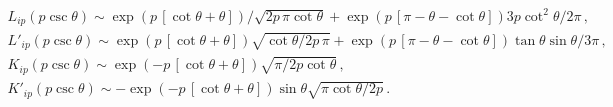 \begin{equation}\label{p<x}\begin{array}{l} L_{ip}(p\csc\theta)\sim \exp(p\,[\cot\theta+\theta])/\sqrt{2p\,\pi\cot\theta}+
\exp(p\,[\pi-\theta-\cot\theta])3p\cot^2\theta/2\pi\,,\\
L'_{ip}(p\csc\theta)\sim
\exp(p\,[\cot\theta+\theta])\sqrt{\cot\theta/2p\,\pi}+\exp(p\,[\pi-\theta-\cot\theta])\tan\theta\sin\theta/3\pi\,,\\
K_{ip}(p\csc\theta)\sim
\exp(-p\,[\cot\theta+\theta])\sqrt{\pi/2p\cot\theta}\,,\\K'_{ip}(p\csc\theta)\sim
-\exp(-p\,[\cot\theta+\theta])\sin\theta\sqrt{\pi\cot\theta/2p}\,.
\end{array}\end{equation}


